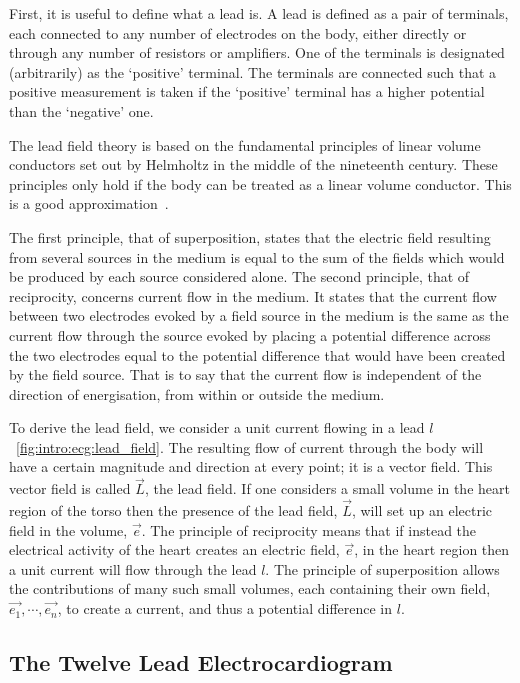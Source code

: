 First, it is useful to define what a lead is.
A lead is defined as a pair of terminals, each connected to any number of electrodes
on the body, either directly or through any number of resistors or amplifiers.
One of the terminals is designated (arbitrarily) as the `positive' terminal.
The terminals are connected such that a positive measurement is taken if
the `positive' terminal has a higher potential than the `negative' one.

The lead field theory is based on the fundamental principles of linear volume
conductors set out by Helmholtz in the middle of the nineteenth century.
These principles only hold if the body can be treated as a linear volume
conductor.
This is a good approximation~\cite{Geddes1967}.

The first principle, that of superposition, states that the electric field
resulting from several sources in the medium is equal to the sum of the fields
which would be produced by each source considered alone.
The second principle, that of reciprocity, concerns current flow in the
medium.
It states that the current flow between two electrodes evoked by a field source in the
medium is the same as the current flow through the source evoked by placing a
potential difference across the two electrodes equal to the potential difference
that would have been created by the field source.
That is to say that the current flow is independent of the direction of
energisation, from within or outside the medium.

To derive the lead field, we consider a unit current flowing in a
lead $l$~\ref{fig:intro:ecg:lead_field}.
The resulting flow of current through the body will have a certain magnitude and
direction at every point; it is a vector field.
This vector field is called $\vec{L}$, the lead field.
If one considers a small volume in the heart region of the torso then the
presence of the lead field, $\vec{L}$, will set up an electric field in the
volume, $\vec{e}$.
The principle of reciprocity means that if instead the electrical activity of
the heart creates an electric field, $\vec{e}$, in the heart region then a unit
current will flow through the lead $l$.
The principle of superposition allows the contributions of many such small
volumes, each containing their own field, $\vec{e_1},\cdots,\vec{e_n}$, to
create a current, and thus a potential difference in $l$.


\subsection{The Twelve Lead Electrocardiogram}

